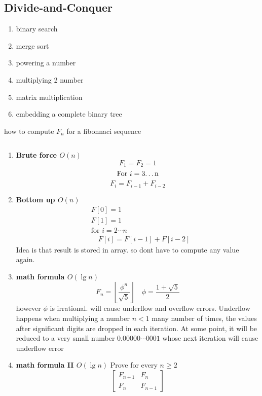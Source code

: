 \documentclass[11pt]{article}
\begin{document}
\subsection*{Divide-and-Conquer}

\begin{enumerate}
  \item binary search
  \item merge sort
  \item powering a number
  \item multiplying 2 number
  \item matrix multiplication
  \item embedding a complete binary tree
\end{enumerate}

\begin{example} how to compute $F_n$ for a fibonnaci sequence
\begin{solution}
  $ $\\
  \begin{enumerate}
    \item \textbf{Brute force $O(n)$}
    \[
      F_1 = F_2 = 1
    \]
    \[
      \text{For $i = 3$\dots n}
    \]
    \[
      F_i = F_{i-1} + F_{i-2}
    \]
    \item \textbf{Bottom up $O(n)$}
    \begin{align}
      &F[0] = 1\\
      &F[1] = 1\\
      &\text{for } i = 2\cdots n\\
      &\quad F[i] = F[i-1] + F[i-2]
    \end{align}
    Idea is that result is stored in array. so dont have to compute any value again.
    \item \textbf{math formula $O(\lg n)$}
    \[
      F_n = \left\lfloor \frac{\phi^n}{\sqrt{5}} \right\rfloor \quad \phi = \frac{1 + \sqrt{5}}{2}
    \]
    however $\phi$ is irrational. will cause underflow and overflow errors. Underflow happens when multiplying a number $n < 1$ many number of times, the values after significant digits are dropped in each iteration. At some point, it will be reduced to a very small number $0.00000\cdots 0001$ whose next iteration will cause underflow error
    \item \textbf{math formula II $O(\lg n)$}
    Prove for every $n\geq 2$
    \[
      \begin{bmatrix}
        F_{n+1} & F_{n} \\
        F_n & F_{n-1}
      \end{bmatrix}
\]
\end{enumerate}
\end{solution}
\end{example}
\end{document}
